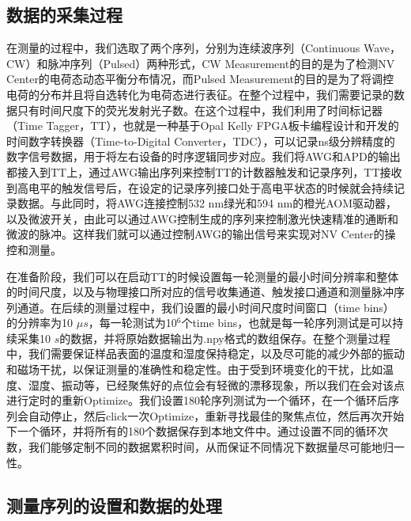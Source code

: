 \documentclass[type = bachelor, oneside]{whu-thesis}
\begin{document}
\subsection{数据的采集过程}
在测量的过程中，我们选取了两个序列，分别为连续波序列（Continuous Wave，CW）和脉冲序列（Pulsed）两种形式，CW Measurement的目的是为了检测NV Center的电荷态动态平衡分布情况，而Pulsed Measurement的目的是为了将调控电荷的分布并且将自选转化为电荷态进行表征。在整个过程中，我们需要记录的数据只有时间尺度下的荧光发射光子数。在这个过程中，我们利用了时间标记器（Time Tagger，TT），也就是一种基于Opal Kelly FPGA板卡编程设计和开发的时间数字转换器（Time-to-Digital Converter，TDC），可以记录ns级分辨精度的数字信号数据，用于将左右设备的时序逻辑同步对应。我们将AWG和APD的输出都接入到TT上，通过AWG输出序列来控制TT的计数器触发和记录序列，TT接收到高电平的触发信号后，在设定的记录序列接口处于高电平状态的时候就会持续记录数据。与此同时，将AWG连接控制532 nm绿光和594 nm的橙光AOM驱动器，以及微波开关，由此可以通过AWG控制生成的序列来控制激光快速精准的通断和微波的脉冲。这样我们就可以通过控制AWG的输出信号来实现对NV Center的操控和测量。

在准备阶段，我们可以在启动TT的时候设置每一轮测量的最小时间分辨率和整体的时间尺度，以及与物理接口所对应的信号收集通道、触发接口通道和测量脉冲序列通道。在后续的测量过程中，我们设置的最小时间尺度时间窗口（time bins）的分辨率为10 $\mu s$，每一轮测试为10$^6$个time bins，也就是每一轮序列测试是可以持续采集10 $s$的数据，并将原始数据输出为.npy格式的数组保存。在整个测量过程中，我们需要保证样品表面的温度和湿度保持稳定，以及尽可能的减少外部的振动和磁场干扰，以保证测量的准确性和稳定性。由于受到环境变化的干扰，比如温度、湿度、振动等，已经聚焦好的点位会有轻微的漂移现象，所以我们在会对该点进行定时的重新Optimize。我们设置180轮序列测试为一个循环，在一个循环后序列会自动停止，然后click一次Optimize，重新寻找最佳的聚焦点位，然后再次开始下一个循环，并将所有的180个数据保存到本地文件中。通过设置不同的循环次数，我们能够定制不同的数据累积时间，从而保证不同情况下数据量尽可能地归一性。


\subsection{测量序列的设置和数据的处理}
\end{document}
